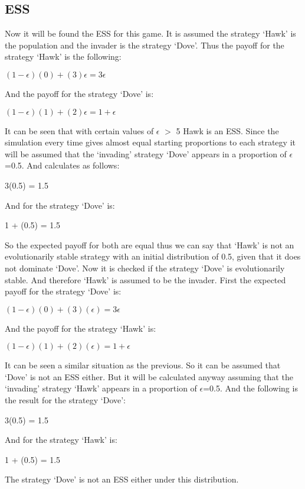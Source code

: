 \subsection{ESS}
Now it will be found the ESS for this game. It is assumed the strategy  `Hawk' is the population and the invader is the strategy `Dove'. Thus the payoff for the strategy `Hawk' is the following:
\begin{center}
$(1-{\epsilon})(0) + (3){\epsilon} = 3{\epsilon}$
\end{center}
And the payoff for the strategy `Dove' is:
\begin{center}
$(1-{\epsilon})(1) + (2){\epsilon} = 1 + {\epsilon}$
\end{center}
It can be seen that with certain values of $\epsilon$ $>$ 5 Hawk is an ESS. Since the simulation every time gives almost equal starting proportions to each strategy it will  be assumed that the `invading' strategy `Dove' appears in a proportion of $\epsilon$=0.5. And calculates as follows:
\begin{center}
3(0.5) = 1.5
\end{center}
And for the strategy `Dove' is:
\begin{center}
 1 + (0.5) = 1.5
\end{center}
So the expected payoff for both are equal thus we can say that `Hawk' is not an evolutionarily stable strategy with an initial distribution of 0.5, given that it does not dominate `Dove'.
Now it is checked if the strategy `Dove' is evolutionarily stable. And therefore `Hawk' is assumed to be the invader. First the expected payoff for the strategy `Dove' is:
\begin{center}
$(1-{\epsilon})(0) + (3)({\epsilon}) = 3{\epsilon} $
\end{center}
And the payoff for the strategy `Hawk' is:
\begin{center}
$(1-{\epsilon})(1) + (2)({\epsilon}) =  1 + {\epsilon}$
\end{center}
It can be seen a similar situation as the previous. So it can be assumed that `Dove' is not an ESS either. But it will be calculated anyway assuming that the `invading' strategy `Hawk' appears in a proportion of $\epsilon$=0.5. And the following is the result for the strategy `Dove':
\begin{center}
3(0.5) = 1.5
\end{center}
And for the strategy `Hawk' is:
\begin{center}
 1 + (0.5) = 1.5
\end{center}
The strategy `Dove' is not an ESS either under this distribution.

